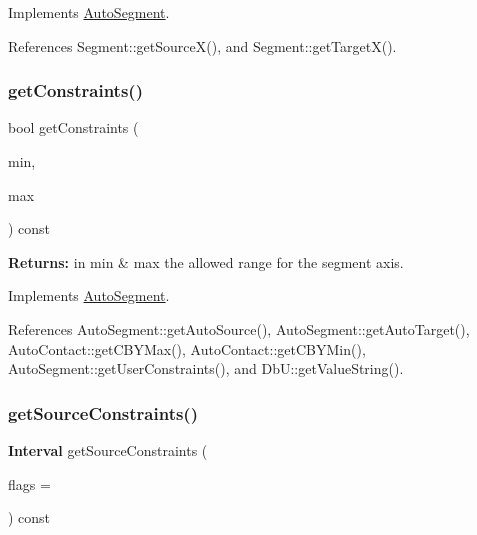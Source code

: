 Implements \mbox{\hyperlink{classKatabatic_1_1AutoSegment_a248eb2fbb06e3286650b28567d495f0b}{Auto\+Segment}}.



References Segment\+::get\+Source\+X(), and Segment\+::get\+Target\+X().

\mbox{\label{classKatabatic_1_1AutoHorizontal_a16737e7f2b77f8595fd2b607fac0f2f5}} 
\subsubsection{\texorpdfstring{get\+Constraints()}{getConstraints()}}
{\footnotesize\ttfamily bool get\+Constraints (\begin{DoxyParamCaption}\item[{\textbf{ Db\+U\+::\+Unit} \&}]{min,  }\item[{\textbf{ Db\+U\+::\+Unit} \&}]{max }\end{DoxyParamCaption}) const\hspace{0.3cm}{\ttfamily [virtual]}}

{\bfseries Returns\+:} in {\ttfamily min} \& {\ttfamily max} the allowed range for the segment axis. 

Implements \mbox{\hyperlink{classKatabatic_1_1AutoSegment_a7c2fed22b081f8d3b7a69abb457153ea}{Auto\+Segment}}.



References Auto\+Segment\+::get\+Auto\+Source(), Auto\+Segment\+::get\+Auto\+Target(), Auto\+Contact\+::get\+C\+B\+Y\+Max(), Auto\+Contact\+::get\+C\+B\+Y\+Min(), Auto\+Segment\+::get\+User\+Constraints(), and Db\+U\+::get\+Value\+String().

\mbox{\label{classKatabatic_1_1AutoHorizontal_a3239751f475bc65adb9d56f6c771ebb0}} 
\subsubsection{\texorpdfstring{get\+Source\+Constraints()}{getSourceConstraints()}}
{\footnotesize\ttfamily \textbf{ Interval} get\+Source\+Constraints (\begin{DoxyParamCaption}\item[{unsigned int}]{flags = {} }\end{DoxyParamCaption}) const\hspace{0.3cm}{\ttfamily [virtual]}}

